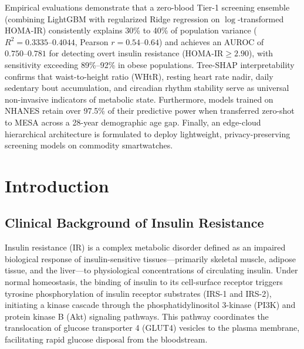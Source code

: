 \documentclass[12pt,a4paper,oneside]{report}
\begin{document}
\vspace{0.35cm}
\noindent
Empirical evaluations demonstrate that a zero-blood Tier-1 screening ensemble (combining LightGBM with regularized Ridge regression on $\log$-transformed HOMA-IR) consistently explains 30\% to 40\% of population variance ($R^2 = 0.3335\text{--}0.4044$, Pearson $r = 0.54\text{--}0.64$) and achieves an AUROC of $0.750\text{--}0.781$ for detecting overt insulin resistance ($\text{HOMA-IR} \ge 2.90$), with sensitivity exceeding 89\%--92\% in obese populations. Tree-SHAP interpretability confirms that waist-to-height ratio (WHtR), resting heart rate nadir, daily sedentary bout accumulation, and circadian rhythm stability serve as universal non-invasive indicators of metabolic state. Furthermore, models trained on NHANES retain over 97.5\% of their predictive power when transferred zero-shot to MESA across a 28-year demographic age gap. Finally, an edge-cloud hierarchical architecture is formulated to deploy lightweight, privacy-preserving screening models on commodity smartwatches.

\newpage

\tableofcontents
\newpage

\listoffigures
\newpage

\listoftables
\newpage

\setcounter{page}{1}

\chapter{Introduction}

\section{Clinical Background of Insulin Resistance}
Insulin resistance (IR) is a complex metabolic disorder defined as an impaired biological response of insulin-sensitive tissues---primarily skeletal muscle, adipose tissue, and the liver---to physiological concentrations of circulating insulin. Under normal homeostasis, the binding of insulin to its cell-surface receptor triggers tyrosine phosphorylation of insulin receptor substrates (IRS-1 and IRS-2), initiating a kinase cascade through the phosphatidylinositol 3-kinase (PI3K) and protein kinase B (Akt) signaling pathways. This pathway coordinates the translocation of glucose transporter 4 (GLUT4) vesicles to the plasma membrane, facilitating rapid glucose disposal from the bloodstream.
\end{document}
